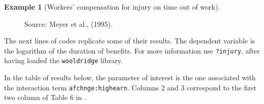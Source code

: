 \documentclass[
  12pt,
]{book}
\newenvironment{Shaded}{\begin{snugshade}}{\end{snugshade}}
\newcommand{\AttributeTok}[1]{\textcolor[rgb]{0.13,0.29,0.53}{#1}}
\newcommand{\CommentTok}[1]{\textcolor[rgb]{0.56,0.35,0.01}{\textit{#1}}}
\newcommand{\DecValTok}[1]{\textcolor[rgb]{0.00,0.00,0.81}{#1}}
\newcommand{\FunctionTok}[1]{\textcolor[rgb]{0.13,0.29,0.53}{\textbf{#1}}}
\newcommand{\NormalTok}[1]{#1}
\newcommand{\OtherTok}[1]{\textcolor[rgb]{0.56,0.35,0.01}{#1}}
\newcommand{\SpecialCharTok}[1]{\textcolor[rgb]{0.81,0.36,0.00}{\textbf{#1}}}
\theoremstyle{definition}
\theoremstyle{definition}
\newtheorem{example}{Example}[chapter]
\theoremstyle{definition}
\theoremstyle{definition}
\theoremstyle{remark}
\begin{document}
\begin{example}[Workers' compensation for injury on time out of work]
\begin{figure}
{}

\caption{Source: Meyer et al., (1995).}\label{fig:figMeyer}
\end{figure}

The next lines of codes replicate some of their results. The dependent variable is the logarithm of the duration of benefits. For more information use \texttt{?injury}, after having loaded the \texttt{wooldridge} library.

In the table of results below, the parameter of interest is the one associated with the interaction term \texttt{afchnge:highearn}. Columns 2 and 3 correspond to the first two column of Table 6 in \citet{Meyer_Viscusi_Durbin_1995}.

\begin{Shaded}
\end{Shaded}
\end{example}
\end{document}
